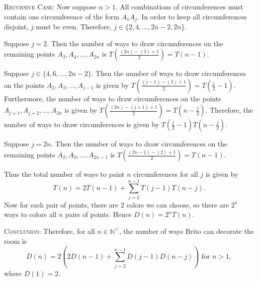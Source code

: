 \documentclass{article}
\begin{document}
    \vspace{1.5mm}
    \textsc{Recursive Case}: Now suppose $n > 1$. All combinations of circumferences must contain one circumference of the form $A_{1}A_{j}$. In order to keep all circumferences disjoint, $j$ must be even. Therefore, $j \in \{2, 4, \dots, 2n - 2, 2n\}$.
    
    \begin{Cases}
        \item Suppose $j = 2$. Then the number of ways to draw circumferences on the remaining points $A_{3}, A_{4}, \dots, A_{2n}$ is $T\left(\frac{(2n) - (3) + 1}{2}\right) = T(n - 1)$.
        \item Suppose $j \in \{4, 6, \dots, 2n - 2\}$. Then the number of ways to draw circumferences on the points $A_{2}, A_{3}, \dots, A_{j - 1}$ is given by $T\left(\frac{(j - 1) - (2) + 1}{2}\right) = T(\frac{j}{2} - 1)$. Furthermore, the number of ways to draw circumferences on the points $A_{j + 1}, A_{j + 2}, \dots, A_{2n}$ is given by $T\left(\frac{(2n) - (j + 1) + 1}{2}\right) = T(n - \frac{j}{2})$. Therefore, the number of ways to draw circumferences is given by $T(\frac{j}{2} - 1)T(n - \frac{j}{2}).$
        \item Suppose $j = 2n$. Then the number of ways to draw circumferences on the remaining points $A_{2}, A_{3}, \dots, A_{2n - 1}$ is $T\left(\frac{(2n - 1) - (2) + 1}{2}\right) = T(n - 1)$.
    \end{Cases}
    Thus the total number of ways to paint $n$ circumferences for all $j$ is given by $$T(n) = 2T(n - 1) + \sum_{j = 2}^{n - 1} T(j - 1)T(n - j).$$ Now for each pair of points, there are $2$ colors we can choose, so there are $2^{n}$ ways to colors all $n$ pairs of points. Hence $D(n) = 2^{n}T(n)$.
    
    \vspace{1.5mm}
    \textsc{Conclusion}: Therefore, for all $n \in \mathbb{N}^{+}$, the number of ways Brito can decorate the room is $$D(n) = 2 \left(2D(n - 1) + \sum_{j = 2}^{n - 1} D(j - 1)D(n - j)\right) \text{ for $n > 1$},$$ where $D(1) = 2$.
\end{document}
